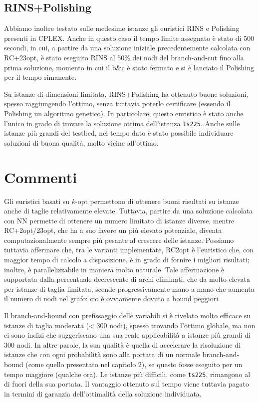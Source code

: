 \subsection{RINS+Polishing}
Abbiamo inoltre testato sulle medesime istanze gli euristici RINS e Polishing presenti in CPLEX. Anche in questo caso il tempo limite assegnato è stato di 500 secondi, in cui, a partire da una soluzione iniziale precedentemente calcolata con RC+23opt, è stato eseguito RINS al 50\% dei nodi del branch-and-cut fino alla prima soluzione, momento in cui il b\&c è stato fermato e si è lanciato il Polishing per il tempo rimanente.

Su istanze di dimensioni limitata, RINS+Polishing ha ottenuto buone soluzioni, spesso raggiungendo l’ottimo, senza tuttavia poterlo certificare (essendo il Polishing un algoritmo genetico). In particolare, questo euristico è stato anche l’unico in grado di trovare la soluzione ottima dell’istanza \texttt{ts225}. Anche sulle istanze più grandi del testbed, nel tempo dato è stato possibile individuare soluzioni di buona qualità, molto vicine all’ottimo.

\section{Commenti}
Gli euristici basati su $k$-opt permettono di ottenere buoni risultati su istanze anche di taglie relativamente elevate. Tuttavia, partire da una soluzione calcolata con NN permette di ottenere un numero limitato di istanze diverse, mentre RC+2opt/23opt, che ha a suo favore un più elevato potenziale, diventa computazionalmente sempre più pesante al crescere delle istanze. Possiamo tuttavia affermare che, tra le varianti implementate, RC2opt è l’euristico che, con maggior tempo di calcolo a disposizione, è in grado di fornire i migliori risultati; inoltre, è parallelizzabile in maniera molto naturale. Tale affermazione è supportata dalla percentuale decrescente di archi eliminati, che da molto elevata per istanze di taglia limitata, scende progressivamente mano a mano che aumenta il numero di nodi nel grafo: cio è ovviamente dovuto a bound peggiori.

Il branch-and-bound con prefissaggio delle variabili si è rivelato molto efficace su istanze di taglia moderata (< 300 nodi), spesso trovando l’ottimo globale, ma non ci sono indizi che suggeriscano una sua reale applicabilità a istanze più grandi di 300 nodi. In altre parole, la sua qualità è quella di accelerare la risoluzione di istanze che con ogni probabilità sono alla portata di un normale branch-and-bound (come quello presentato nel capitolo 2), se questo fosse eseguito per un tempo maggiore (qualche ora). Le istanze più difficili, come \texttt{ts225}, rimangono al di fuori della sua portata. Il vantaggio ottenuto sul tempo viene tuttavia pagato in termini di garanzia dell’ottimalità della soluzione individuata.

